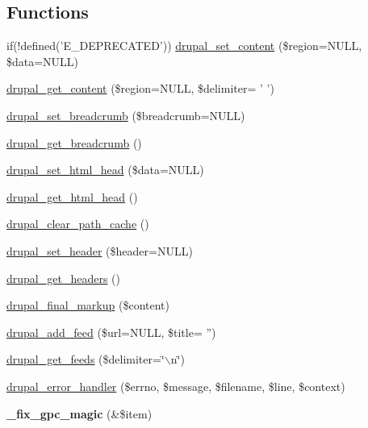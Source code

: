 \subsection*{Functions}
\begin{CompactItemize}
\item 
if(!defined('E\_\-DEPRECATED')) \hyperlink{common_8inc_5dca93683c64a722bd4f277b8e9f488b}{drupal\_\-set\_\-content} (\$region=NULL, \$data=NULL)
\item 
\hyperlink{common_8inc_57f11487017e5fb889f797456300fc4c}{drupal\_\-get\_\-content} (\$region=NULL, \$delimiter= ' ')
\item 
\hyperlink{common_8inc_666113d06fa6ea461aff580e5c511eb0}{drupal\_\-set\_\-breadcrumb} (\$breadcrumb=NULL)
\item 
\hyperlink{common_8inc_f1e9626192d1d2e5e63b370e88c03c7c}{drupal\_\-get\_\-breadcrumb} ()
\item 
\hyperlink{common_8inc_6646f70c300f3a24a25350a47e90d3d1}{drupal\_\-set\_\-html\_\-head} (\$data=NULL)
\item 
\hyperlink{common_8inc_cdee011d76859a5a9280209df1175188}{drupal\_\-get\_\-html\_\-head} ()
\item 
\hyperlink{common_8inc_1c3a768c3c1b4751977330e20f098c32}{drupal\_\-clear\_\-path\_\-cache} ()
\item 
\hyperlink{common_8inc_412817c1abb5163a2deb44eb3469b62c}{drupal\_\-set\_\-header} (\$header=NULL)
\item 
\hyperlink{common_8inc_940dc177a758d9aa97e7e88a4cb839ca}{drupal\_\-get\_\-headers} ()
\item 
\hyperlink{common_8inc_2b6eb80241d0d2b40c483a4752389aa9}{drupal\_\-final\_\-markup} (\$content)
\item 
\hyperlink{common_8inc_42e1c8001e2609cb73a2f54f59e1020c}{drupal\_\-add\_\-feed} (\$url=NULL, \$title= '')
\item 
\hyperlink{common_8inc_c7df9703641369003434d49cf917c16e}{drupal\_\-get\_\-feeds} (\$delimiter=\char`\"{}$\backslash$n\char`\"{})
\item 
\hyperlink{common_8inc_32d79f124e1b94540b0b4edbde95a892}{drupal\_\-error\_\-handler} (\$errno, \$message, \$filename, \$line, \$context)
\item 
\hypertarget{common_8inc_4060ad61de80e6b8931ce8ad3c3aaebc}{
\textbf{\_\-fix\_\-gpc\_\-magic} (\&\$item)}
\label{common_8inc_4060ad61de80e6b8931ce8ad3c3aaebc}


\end{CompactItemize}
